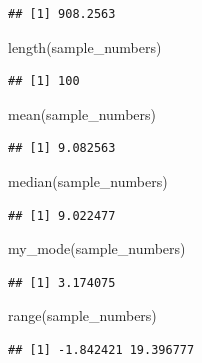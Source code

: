 \documentclass[
]{book}
\newenvironment{Shaded}{\begin{snugshade}}{\end{snugshade}}
\newcommand{\FunctionTok}[1]{\textcolor[rgb]{0.00,0.00,0.00}{#1}}
\newcommand{\NormalTok}[1]{#1}
\begin{document}
\begin{verbatim}
## [1] 908.2563
\end{verbatim}

\begin{Shaded}
\begin{Highlighting}[]
\FunctionTok{length}\NormalTok{(sample\_numbers)}
\end{Highlighting}
\end{Shaded}

\begin{verbatim}
## [1] 100
\end{verbatim}

\begin{Shaded}
\begin{Highlighting}[]
\FunctionTok{mean}\NormalTok{(sample\_numbers)}
\end{Highlighting}
\end{Shaded}

\begin{verbatim}
## [1] 9.082563
\end{verbatim}

\begin{Shaded}
\begin{Highlighting}[]
\FunctionTok{median}\NormalTok{(sample\_numbers)}
\end{Highlighting}
\end{Shaded}

\begin{verbatim}
## [1] 9.022477
\end{verbatim}

\begin{Shaded}
\begin{Highlighting}[]
\FunctionTok{my\_mode}\NormalTok{(sample\_numbers)}
\end{Highlighting}
\end{Shaded}

\begin{verbatim}
## [1] 3.174075
\end{verbatim}

\begin{Shaded}
\begin{Highlighting}[]
\FunctionTok{range}\NormalTok{(sample\_numbers)}
\end{Highlighting}
\end{Shaded}

\begin{verbatim}
## [1] -1.842421 19.396777
\end{verbatim}
\end{document}
